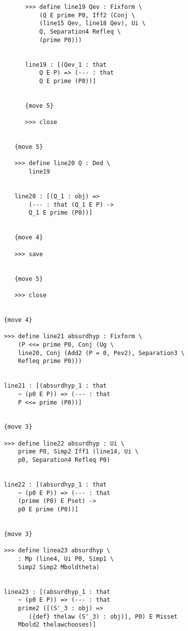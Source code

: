 \documentclass[12pt]{article}
\begin{document}
\begin{verbatim}
                  >>> define line19 Qev : Fixform \
                      (Q E prime P0, Iff2 (Conj \
                      (line15 Qev, line18 Qev), Ui \
                      Q, Separation4 Refleq \
                      (prime P0)))


                  line19 : [(Qev_1 : that 
                      Q E P) => (--- : that 
                      Q E prime (P0))]


                  {move 5}

                  >>> close


               {move 5}

               >>> define line20 Q : Ded \
                   line19


               line20 : [(Q_1 : obj) => 
                   (--- : that (Q_1 E P) -> 
                   Q_1 E prime (P0))]


               {move 4}

               >>> save


               {move 5}

               >>> close


            {move 4}

            >>> define line21 absurdhyp : Fixform \
                (P <<= prime P0, Conj (Ug \
                line20, Conj (Add2 (P = 0, Pev2), Separation3 \
                Refleq prime P0)))


            line21 : [(absurdhyp_1 : that 
                ~ (p0 E P)) => (--- : that 
                P <<= prime (P0))]


            {move 3}

            >>> define line22 absurdhyp : Ui \
                prime P0, Simp2 Iff1 (line14, Ui \
                p0, Separation4 Refleq P0)


            line22 : [(absurdhyp_1 : that 
                ~ (p0 E P)) => (--- : that 
                (prime (P0) E Pset) -> 
                p0 E prime (P0))]


            {move 3}

            >>> define linea23 absurdhyp \
                : Mp (line4, Ui P0, Simp1 \
                Simp2 Simp2 Mboldtheta)


            linea23 : [(absurdhyp_1 : that 
                ~ (p0 E P)) => (--- : that 
                prime2 ([(S'_3 : obj) => 
                   ({def} thelaw (S'_3) : obj)], P0) E Misset 
                Mbold2 thelawchooses)]



\end{verbatim}
\end{document}
